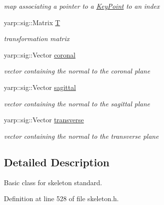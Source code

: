 \begin{DoxyCompactItemize}
\begin{DoxyCompactList}\small\item\em map associating a pointer to a \mbox{\hyperlink{classassistive__rehab_1_1KeyPoint}{Key\+Point}} to an index \end{DoxyCompactList}\item 
\mbox{\label{classassistive__rehab_1_1Skeleton_a358a1c5eb23a562f8558ff8d43583ef7}} 
yarp\+::sig\+::\+Matrix \mbox{\hyperlink{classassistive__rehab_1_1Skeleton_a358a1c5eb23a562f8558ff8d43583ef7}{T}}
\begin{DoxyCompactList}\small\item\em transformation matrix \end{DoxyCompactList}\item 
\mbox{\label{classassistive__rehab_1_1Skeleton_ad042a7e60e6d72cc87b06c5fb0bdfae2}} 
yarp\+::sig\+::\+Vector \mbox{\hyperlink{classassistive__rehab_1_1Skeleton_ad042a7e60e6d72cc87b06c5fb0bdfae2}{coronal}}
\begin{DoxyCompactList}\small\item\em vector containing the normal to the coronal plane \end{DoxyCompactList}\item 
\mbox{\label{classassistive__rehab_1_1Skeleton_a72d6ccb619619e77a17258b08496a972}} 
yarp\+::sig\+::\+Vector \mbox{\hyperlink{classassistive__rehab_1_1Skeleton_a72d6ccb619619e77a17258b08496a972}{sagittal}}
\begin{DoxyCompactList}\small\item\em vector containing the normal to the sagittal plane \end{DoxyCompactList}\item 
\mbox{\label{classassistive__rehab_1_1Skeleton_ab8a9bf9297f520e8de801248e0b8d2dd}} 
yarp\+::sig\+::\+Vector \mbox{\hyperlink{classassistive__rehab_1_1Skeleton_ab8a9bf9297f520e8de801248e0b8d2dd}{transverse}}
\begin{DoxyCompactList}\small\item\em vector containing the normal to the transverse plane \end{DoxyCompactList}\end{DoxyCompactItemize}


\subsection{Detailed Description}
Basic class for skeleton standard. 

Definition at line 528 of file skeleton.\+h.



